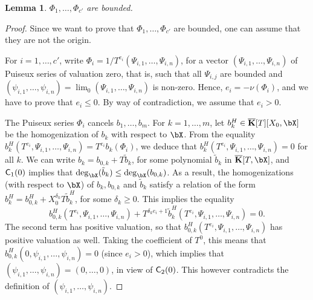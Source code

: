 \documentclass[12pt]{article}
\newtheorem{lemma}[definition]{Lemma}
\begin{document}
\begin{lemma}
   $\Phi_1,\dots,\Phi_{c'}$ are bounded.
\end{lemma}
\begin{proof}
  Since we want to prove that $\Phi_1,\dots,\Phi_{c'}$ are bounded,
  one can assume that they are not the origin.  

  For $i=1,\dots,c'$, write
  $\Phi_i=1/T^{e_i} (\Psi_{i,1},\dots,\Psi_{i,n})$, for a vector
  $(\Psi_{i,1},\dots,\Psi_{i,n})$ of Puiseux series of valuation zero,
  that is, such that all $\Psi_{i,j}$ are bounded and
  $(\psi_{i,1},\dots,\psi_{i,n})=\lim_0(\Psi_{i,1},\dots,\Psi_{i,n})$
  is non-zero. Hence, $e_i=-\nu(\Phi_i)$, and we have to prove that
  $e_i \le 0$.  By way of contradiction, we assume that $e_i > 0$.

  The Puiseux series $\Phi_i$ cancels $b_1,\dots,b_m$. For
  $k=1,\dots,m$, let $b_k^H \in \KKbar[T][X_0,\bX]$ be the homogenization
  of $b_k$ with respect to $\bX$. From the equality
  $b_k^H(T^{e_i},\Psi_{i,1},\dots,\Psi_{i,n})=
  T^{e_i}b_k(\Phi_i)$, we deduce that
  $b_k^H(T^{e_i},\Psi_{i,1},\dots,\Psi_{i,n})=0$ for all $k$. We
  can write $b_k = b_{0,k} + T \tilde b_k$, for some polynomial
  $\tilde b_k$ in $\KKbar[T,\bX]$, and $\mathsf{C}_1(0)$ implies that
  $\deg_\bX(\tilde b_k) \le \deg_\bX(b_{0,k})$. As a result, the
  homogenizations (with respect to $\bX$) of $b_{k},b_{0,k}$ and $\tilde
  b_k$ satisfy a relation of the form $b^H_k = b_{0,k}^H +
  X_0^{\delta_k} T \tilde b^H_k$, for some $\delta_k \ge 0$. This
  implies the equality
  $$b_{0,k}^H(T^{e_i},\Psi_{i,1},\dots,\Psi_{i,n}) + T^{\delta_k
    e_i+1}\tilde b_k^H(T^{e_i},\Psi_{i,1},\dots,\Psi_{i,n})=0.$$
  The second term has positive valuation, so that
  $b_{0,k}^H(T^{e_i},\Psi_{i,1},\dots,\Psi_{i,n})$ has positive
  valuation as well. Taking the coefficient of $T^0$, this means 
  that $b_{0,k}^H(0,\psi_{i,1},\dots,\psi_{i,n})=0$ (since $e_i > 0$), which implies 
  that $(\psi_{i,1},\dots,\psi_{i,n})=(0,\dots,0)$, in view of $\mathsf{C}_2(0)$.
  This however contradicts the definition of $(\psi_{i,1},\dots,\psi_{i,n})$.
\end{proof}
\end{document}
